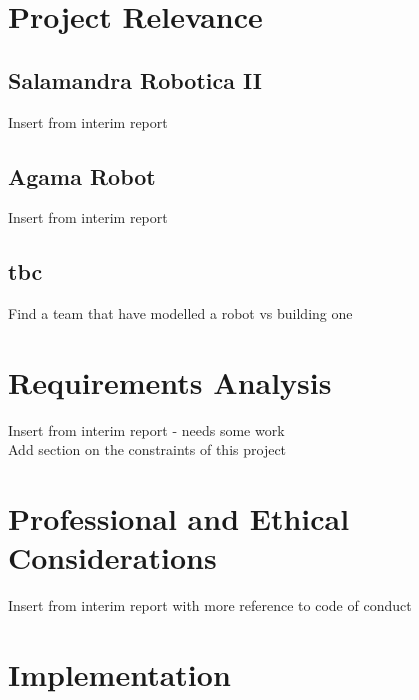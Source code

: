 \documentclass{article}
\begin{document}
\newpage
\section{Project Relevance}
\subsection{Salamandra Robotica II}
Insert from interim report
\subsection{Agama Robot}
Insert from interim report
\subsection{tbc}
Find a team that have modelled a robot vs building one

\newpage
\section{Requirements Analysis}
Insert from interim report - needs some work\\
Add section on the constraints of this project

\newpage
\section{Professional and Ethical Considerations}
Insert from interim report with more reference to code of conduct

\newpage
\section{Implementation}
\end{document}
